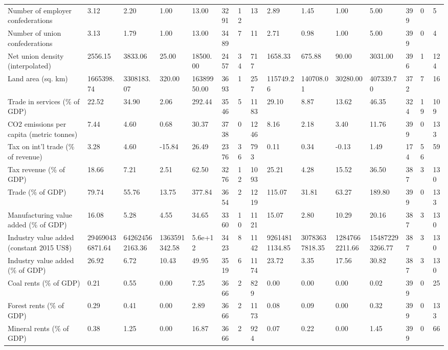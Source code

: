 \begin{longtable}{lllllllllllllll}
Number of employer confederations & 3.12 & 2.20 & 1.00 & 13.00 & 3291 & 12 & 13 & 2.89 & 1.45 & 1.00 & 5.00 & 399 & 0 & 5\\
Number of union confederations & 3.13 & 1.79 & 1.00 & 13.00 & 3489 & 7 & 11 & 2.71 & 0.98 & 1.00 & 5.00 & 399 & 0 & 4\\
Net union density (interpolated) & 2556.15 & 3833.06 & 25.00 & 18500.00 & 2457 & 34 & 717 & 1658.33 & 675.88 & 90.00 & 3031.00 & 396 & 1 & 124\\
Land area (sq. km) & 1665398.74 & 3308183.07 & 320.00 & 16389950.00 & 3693 & 1 & 257 & 115749.26 & 140708.01 & 30280.00 & 407339.70 & 372 & 7 & 16\\
\addlinespace
Trade in services (\% of GDP) & 22.52 & 34.90 & 2.06 & 292.44 & 3546 & 5 & 1183 & 29.10 & 8.87 & 13.62 & 46.35 & 324 & 19 & 109\\
CO2 emissions per capita (metric tonnes) & 7.44 & 4.60 & 0.68 & 30.37 & 3738 & 0 & 1246 & 8.16 & 2.18 & 3.40 & 11.76 & 399 & 0 & 133\\
Tax on int'l trade (\% of revenue) & 3.28 & 4.60 & -15.84 & 26.49 & 2376 & 36 & 793 & 0.11 & 0.34 & -0.13 & 1.49 & 174 & 56 & 59\\
Tax revenue (\% of GDP) & 18.66 & 7.21 & 2.51 & 62.50 & 3276 & 12 & 1093 & 25.21 & 4.28 & 15.52 & 36.50 & 387 & 3 & 130\\
Trade (\% of GDP) & 79.74 & 55.76 & 13.75 & 377.84 & 3654 & 2 & 1219 & 115.07 & 31.81 & 63.27 & 189.80 & 399 & 0 & 133\\
\addlinespace
Manufacturing value added (\% of GDP) & 16.08 & 5.28 & 4.55 & 34.65 & 3360 & 10 & 1121 & 15.07 & 2.80 & 10.29 & 20.16 & 387 & 3 & 130\\
Industry value added (constant 2015 US\$) & 294690436871.64 & 642624562163.36 & 1363591342.58 & 5.6e+12 & 3423 & 8 & 1142 & 92614811134.85 & 30783637818.35 & 12847662211.66 & 154872293266.77 & 387 & 3 & 130\\
Industry value added (\% of GDP) & 26.92 & 6.72 & 10.43 & 49.95 & 3519 & 6 & 1174 & 23.72 & 3.35 & 17.56 & 30.82 & 387 & 3 & 130\\
Coal rents (\% of GDP) & 0.21 & 0.55 & 0.00 & 7.25 & 3666 & 2 & 829 & 0.00 & 0.00 & 0.00 & 0.02 & 399 & 0 & 25\\
Forest rents (\% of GDP) & 0.29 & 0.41 & 0.00 & 2.89 & 3666 & 2 & 1173 & 0.08 & 0.09 & 0.00 & 0.32 & 399 & 0 & 133\\
\addlinespace
Mineral rents (\% of GDP) & 0.38 & 1.25 & 0.00 & 16.87 & 3666 & 2 & 924 & 0.07 & 0.22 & 0.00 & 1.45 & 399 & 0 & 66\\

\end{longtable}
